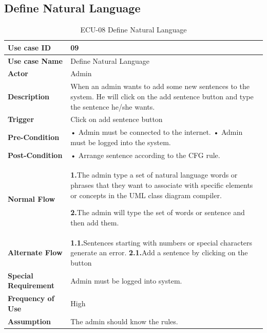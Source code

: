 \documentclass[12pt,a4paper]{article}
\begin{document}
\clearpage
\subsection{Define Natural Language}
\begin{table}[h!]
\caption{ECU-08 Define Natural Language}
    \centering
    \begin{tabular}{|l|p{10cm}|}
    \hline
       \textbf{Use case ID}&09 \\ %
       \hline
       \textbf{Use case Name}&Define Natural Language \\ %
       \hline
       \textbf{Actor}&Admin \\ %
       \hline
       \textbf{Description}&When an admin wants to add some new sentences to the system. He will click on the add sentence button and type the sentence he/she wants.\\ %
        \hline
       \textbf{Trigger}&Click on add sentence button\\ %
        \hline
       \textbf{Pre-Condition}&
 • Admin must be connected to the internet.
\newline• Admin must be logged into the system.
\\ %
        \hline
       \textbf{Post-Condition}&• Arrange sentence according to the CFG rule.
 \\ %
        \hline
       \textbf{Normal Flow}&
    \textbf{1.}The admin type a set of natural language words or phrases that they want to associate with specific elements or concepts in the UML class diagram compiler.

\newline\textbf{2.}The admin will type the set of words or sentence and then add them.\\ %
\hline
       \textbf{Alternate Flow}&
       \textbf{1.1.}Sentences starting with numbers or special characters generate an error.
\newline\textbf{2.1.}Add a sentence by clicking on the button\\ %
        \hline
       \textbf{Special Requirement}&Admin must be logged into system. \\ %
        \hline
       \textbf{Frequency of Use}&High \\ %
        \hline
       \textbf{Assumption}&The admin should know the rules.\\ %
       \hline
    \end{tabular} 
    \end{table}
\end{document}
